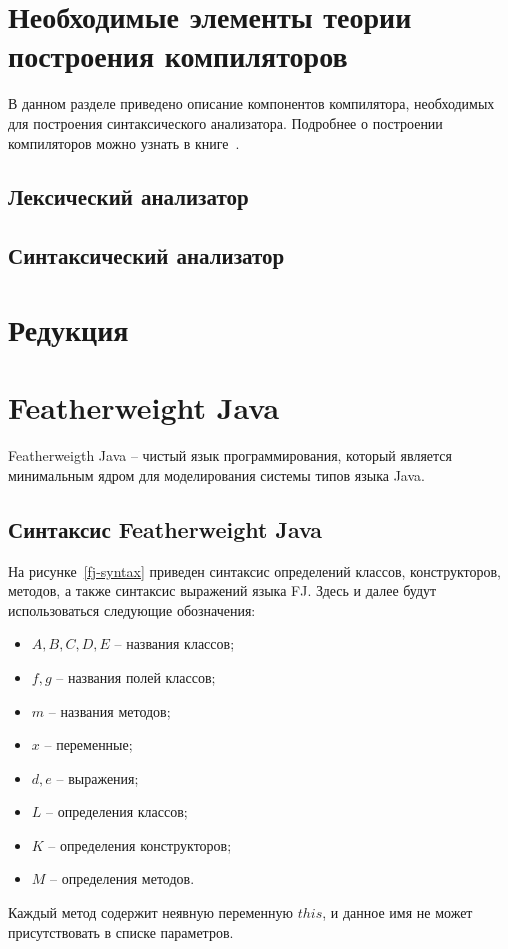 \section{Необходимые элементы теории построения компиляторов}
В данном разделе приведено описание компонентов компилятора, необходимых для построения синтаксического анализатора.
Подробнее о построении компиляторов можно узнать в книге~\cite{dragon}.
\subsection{Лексический анализатор}
\subsection{Синтаксический анализатор}
\section{Редукция}

\section{Featherweight Java}
Featherweigth Java -- чистый язык программирования,
который является минимальным ядром для моделирования системы типов языка Java.
\subsection{Синтаксис Featherweight Java}
На рисунке~\ref{fj-syntax} приведен синтаксис определений классов, конструкторов, методов,
а также синтаксис выражений языка FJ. Здесь и далее будут использоваться следующие обозначения:
\begin{itemize}
    \item $A, B, C, D, E$ -- названия классов;
    \item $f, g$ -- названия полей классов;
    \item $m$ -- названия методов;
    \item $x$ -- переменные;
    \item $d, e$ -- выражения;
    \item $L$ -- определения классов;
    \item $K$ -- определения конструкторов;
    \item $M$ -- определения методов.
\end{itemize}
Каждый метод содержит неявную переменную $this$, и данное имя не может присутствовать в списке параметров.

